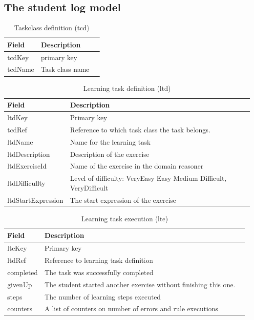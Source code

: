 \subsection{The student log model}
\begin{table}[H]
\begin{tabular}{| l | l | r |}
\hline
Field & Description\\
\hline
tcdKey & primary key\\
tcdName & Task class name\\
\hline
\end{tabular}
\caption{Taskclass definition (tcd)}
\label{Taskclass}
\end{table}


\begin{table}[H]
\begin{tabular}{| l | l | r |}
\hline
Field & Description\\
\hline
ltdKey & Primary key\\
tcdRef & Reference to which task class the task belongs.\\
ltdName & Name for the learning task\\
ltdDescription & Description of the exercise\\
ltdExerciseId & Name of the exercise in the domain reasoner\\
ltdDifficullty & Level of difficulty: VeryEasy Easy Medium Difficult, VeryDifficult \\
ltdStartExpression & The start expression of the exercise\\
\hline
\end{tabular}
\caption{Learning task definition (ltd)}
\label{Learning task definition}
\end{table}

 
\begin{table}[H]
\begin{tabular}{| l | l | r |}
\hline
Field & Description\\
\hline
lteKey & Primary key \\
ltdRef & Reference to learning task definition\\
completed & The task was successfully completed\\
givenUp & The student started another exercise without finishing this one.\\
steps & The number of learning steps executed\\
counters & A list of counters on number of errors and rule executions\\
\hline
\end{tabular}
\caption{Learning task execution (lte)}
\label{Learning task execution}
\end{table}
 
